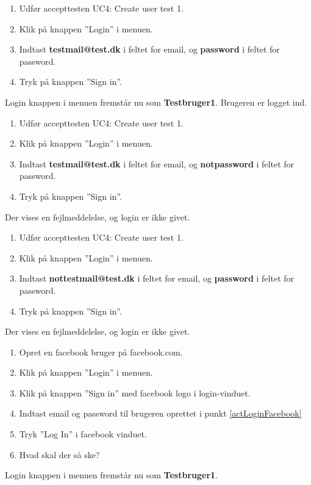 

		{
		\begin{enumerate}
			\item Udfør accepttesten UC4: Create user test 1.
			\item Klik på knappen ''Login'' i menuen.
			\item Indtast \textbf{testmail@test.dk} i feltet for email, og \textbf{password} i feltet for password.
			\item Tryk på knappen ''Sign in''.
		\end{enumerate}
		} %
		{Login knappen i menuen fremstår nu som \textbf{Testbruger1}. Brugeren er logget ind.} %
		{} %
		{} %

		{
		\begin{enumerate}
			\item Udfør accepttesten UC4: Create user test 1.
			\item Klik på knappen ''Login'' i menuen.
			\item Indtast \textbf{testmail@test.dk} i feltet for email, og \textbf{notpassword} i feltet for password.
			\item Tryk på knappen ''Sign in''.
		\end{enumerate}
		} {Der vises en fejlmeddelelse, og login er ikke givet.} %
		{} %
		{} %

		{
		\begin{enumerate}
			\item Udfør accepttesten UC4: Create user test 1.
			\item Klik på knappen ''Login'' i menuen.
			\item Indtast \textbf{nottestmail@test.dk} i feltet for email, og \textbf{password} i feltet for password.
			\item Tryk på knappen ''Sign in''.
		\end{enumerate}
		} {Der vises en fejlmeddelelse, og login er ikke givet.} %
		{} %
		{} %

		{
		\begin{enumerate}
			\item \label{actLoginFacebook} Opret en facebook bruger på facebook.com.
			\item Klik på knappen ''Login'' i menuen.
			\item Klik på knappen ''Sign in'' med facebook logo i login-vinduet.
			\item Indtast email og password til brugeren oprettet i punkt \ref{actLoginFacebook}
			\item Tryk ''Log In'' i facebook vinduet.
			\item Hvad skal der så ske? 
		\end{enumerate}
		} %
		{Login knappen i menuen fremstår nu som \textbf{Testbruger1}.} %
		{} %
		{} %

